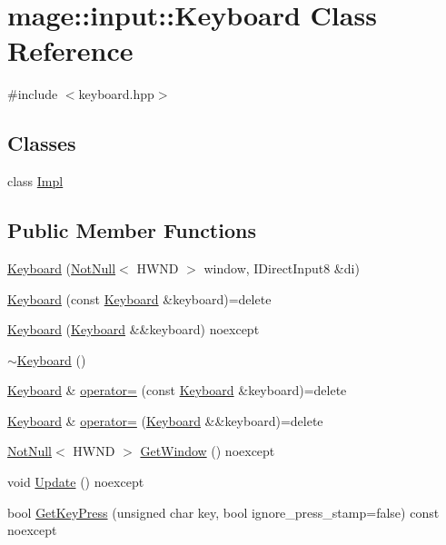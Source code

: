 \hypertarget{classmage_1_1input_1_1_keyboard}{}\section{mage\+:\+:input\+:\+:Keyboard Class Reference}
\label{classmage_1_1input_1_1_keyboard}


{\ttfamily \#include $<$keyboard.\+hpp$>$}

\subsection*{Classes}
\begin{DoxyCompactItemize}
\item 
class \mbox{\hyperlink{classmage_1_1input_1_1_keyboard_1_1_impl}{Impl}}
\end{DoxyCompactItemize}
\subsection*{Public Member Functions}
\begin{DoxyCompactItemize}
\item 
\mbox{\hyperlink{classmage_1_1input_1_1_keyboard_af9ac64b485a4fdca497d007283faca18}{Keyboard}} (\mbox{\hyperlink{namespacemage_a8769f9d670d6b585ea306cb1062af94b}{Not\+Null}}$<$ H\+W\+ND $>$ window, I\+Direct\+Input8 \&di)
\item 
\mbox{\hyperlink{classmage_1_1input_1_1_keyboard_ae7297c3080b0e6f78e37cf94ce3effcb}{Keyboard}} (const \mbox{\hyperlink{classmage_1_1input_1_1_keyboard}{Keyboard}} \&keyboard)=delete
\item 
\mbox{\hyperlink{classmage_1_1input_1_1_keyboard_adb93a42b959d58fc320215157f85854c}{Keyboard}} (\mbox{\hyperlink{classmage_1_1input_1_1_keyboard}{Keyboard}} \&\&keyboard) noexcept
\item 
\mbox{\hyperlink{classmage_1_1input_1_1_keyboard_a71239cd5326f78ab226f145a430b382b}{$\sim$\+Keyboard}} ()
\item 
\mbox{\hyperlink{classmage_1_1input_1_1_keyboard}{Keyboard}} \& \mbox{\hyperlink{classmage_1_1input_1_1_keyboard_a8a06eeb906625f100928f3fe2d17cf9d}{operator=}} (const \mbox{\hyperlink{classmage_1_1input_1_1_keyboard}{Keyboard}} \&keyboard)=delete
\item 
\mbox{\hyperlink{classmage_1_1input_1_1_keyboard}{Keyboard}} \& \mbox{\hyperlink{classmage_1_1input_1_1_keyboard_a7dc2316d53a043fa42e4909bd8e58bb9}{operator=}} (\mbox{\hyperlink{classmage_1_1input_1_1_keyboard}{Keyboard}} \&\&keyboard)=delete
\item 
\mbox{\hyperlink{namespacemage_a8769f9d670d6b585ea306cb1062af94b}{Not\+Null}}$<$ H\+W\+ND $>$ \mbox{\hyperlink{classmage_1_1input_1_1_keyboard_a9838f6a7453f74d545926bf5de4c7750}{Get\+Window}} () noexcept
\item 
void \mbox{\hyperlink{classmage_1_1input_1_1_keyboard_a14e53eed6b75a2c45ca3caf94d797bc0}{Update}} () noexcept
\item 
bool \mbox{\hyperlink{classmage_1_1input_1_1_keyboard_a287feaae6c0bf0a93b97f29a601b177a}{Get\+Key\+Press}} (unsigned char key, bool ignore\+\_\+press\+\_\+stamp=false) const noexcept
\end{DoxyCompactItemize}

